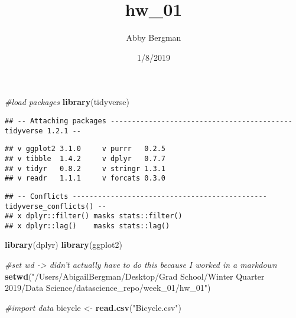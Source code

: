 \documentclass[]{article}
\title{hw\_01}
\author{Abby Bergman}
\date{1/8/2019}
\newenvironment{Shaded}{\begin{snugshade}}{\end{snugshade}}
\newcommand{\KeywordTok}[1]{\textcolor[rgb]{0.13,0.29,0.53}{\textbf{#1}}}
\newcommand{\DecValTok}[1]{\textcolor[rgb]{0.00,0.00,0.81}{#1}}
\newcommand{\StringTok}[1]{\textcolor[rgb]{0.31,0.60,0.02}{#1}}
\newcommand{\CommentTok}[1]{\textcolor[rgb]{0.56,0.35,0.01}{\textit{#1}}}
\newcommand{\OperatorTok}[1]{\textcolor[rgb]{0.81,0.36,0.00}{\textbf{#1}}}
\newcommand{\NormalTok}[1]{#1}
\begin{document}
\maketitle

\begin{Shaded}
\begin{Highlighting}[]
\CommentTok{#load packages}
\KeywordTok{library}\NormalTok{(tidyverse)}
\end{Highlighting}
\end{Shaded}

\begin{verbatim}
## -- Attaching packages ------------------------------------------- tidyverse 1.2.1 --
\end{verbatim}

\begin{verbatim}
## v ggplot2 3.1.0     v purrr   0.2.5
## v tibble  1.4.2     v dplyr   0.7.7
## v tidyr   0.8.2     v stringr 1.3.1
## v readr   1.1.1     v forcats 0.3.0
\end{verbatim}

\begin{verbatim}
## -- Conflicts ---------------------------------------------- tidyverse_conflicts() --
## x dplyr::filter() masks stats::filter()
## x dplyr::lag()    masks stats::lag()
\end{verbatim}

\begin{Shaded}
\begin{Highlighting}[]
\KeywordTok{library}\NormalTok{(dplyr)}
\KeywordTok{library}\NormalTok{(ggplot2)}
\end{Highlighting}
\end{Shaded}

\begin{Shaded}
\begin{Highlighting}[]
\CommentTok{#set wd -> didn't actually have to do this because I worked in a markdown}
\KeywordTok{setwd}\NormalTok{(}\StringTok{"/Users/AbigailBergman/Desktop/Grad School/Winter Quarter 2019/Data Science/datascience_repo/week_01/hw_01"}\NormalTok{)}

\CommentTok{#import data}
\NormalTok{bicycle <-}\StringTok{ }\KeywordTok{read.csv}\NormalTok{(}\StringTok{"Bicycle.csv"}\NormalTok{)}
\end{Highlighting}
\end{Shaded}

\begin{Shaded}
\end{Shaded}
\end{document}

